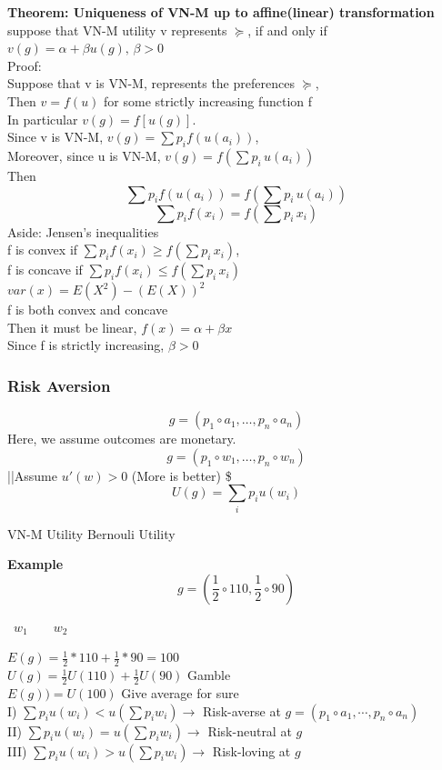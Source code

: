 \documentclass[letterpaper,13pt,single,pdftex]{scrartcl}
\begin{document}
\textbf{Theorem: Uniqueness of VN-M up to affine(linear) transformation}\\
suppose that VN-M utility v represents $\succeq$, if and only if $v(g) = \alpha +\beta u(g), \,\beta >0$\\
Proof: \\
Suppose that v is VN-M, represents the preferences $\succeq$, \\
Then $v=f(u)$ for some strictly increasing function f\\
In particular $v(g) = f[u(g)]$.\\ 
Since v is VN-M, $v(g) = \sum p_i f(u(a_i))$,\\
Moreover, since u is VN-M, $v(g) = f(\sum p_i \,u(a_i))$\\
Then 
\[\sum p_i f(u(a_i)) = f(\sum p_i \,u(a_i))\]
\[\sum p_i f(x_i) = f(\sum p_i \,x_i)\]
Aside: Jensen's inequalities\\
f is convex if $\sum p_i f(x_i) \ge f(\sum p_i \,x_i)$,\\
f is concave if $\sum p_i f(x_i) \le f(\sum p_i \,x_i)$\\
$var(x) = E(X^2) - (E(X))^2$\\
f is both convex and concave\\
Then it must be linear, $f(x) = \alpha +\beta x$\\
Since f is strictly increasing, $\beta >0$\\
\newpage
\subsubsection{Risk Aversion}
\[ g = ( p_1 \circ a_1, \ldots, p_n \circ a_n)\]
Here, we assume outcomes are monetary.
\[ g = (p_1 \circ w_1,\ldots,p_n \circ w_n)\] ||Assume $u'(w) > 0$ (More is better)  \quad  \$
\[U(g) = \sum\limits_{i} p_i u(w_i) \]
\begin{center} VN-M Utility \qquad Bernouli Utility
\end{center}
\textbf{Example}
\[g = (\frac{1}{2}\circ 110, \frac{1}{2}\circ 90)\]
\begin{center}
 \qquad \, $w_1 \qquad w_2$
 \end{center}
$E(g) = \frac{1}{2}* 110 +\frac{1}{2}*90 = 100$\\
$U(g) = \frac{1}{2} U(110) +\frac{1}{2} U(90)$  Gamble\\
$E(g)) = U(100)$ Give average for sure\\

I) $\sum p_i u(w_i) < u (\sum p_i w_i) \rightarrow $ Risk-averse at $g = (p_1 \circ a_1, \cdots, p_n \circ a_n)$\\
II) $\sum p_i u(w_i) = u (\sum p_i w_i) \rightarrow $ Risk-neutral at $g$\\
III) $\sum p_i u(w_i) > u (\sum p_i w_i) \rightarrow $ Risk-loving at $g$\\
\end{document}
